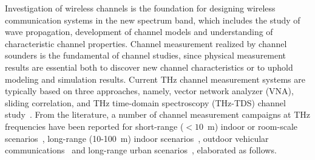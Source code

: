 \documentclass[journal,12pt,draftclsnofoot,onecolumn]{IEEEtran}
\begin{document}
\par Investigation of wireless channels is the foundation for designing wireless communication systems in the new spectrum band, which includes the study of wave propagation, development of channel models and understanding of characteristic channel properties. Channel measurement realized by channel sounders is the fundamental of channel studies, since physical measurement results are essential both to discover new channel characteristics or to uphold modeling and simulation results. Current THz channel measurement systems are typically based on three approaches, namely, vector network analyzer (VNA), sliding correlation, and THz time-domain spectroscopy (THz-TDS) channel study~\cite{wang2022channelsurvey}.
From the literature, a number of channel measurement campaigns at THz frequencies have been reported for short-range ($<10$~m) indoor or room-scale scenarios~\cite{yu2020wideband,yi2021Channel,xing2018propagation,xing2019indoor,kim2016characterization,eckhardt2019measurements,cheng2020thz,fu2020modeling,abbasi2020channel,song2020channel,ju2021millimeter,zantah2019channel}, long-range (10-100~m) indoor scenarios~\cite{Nguyen2018Comparing}, outdoor vehicular communications~\cite{guan2021channel,petrov2020measurements,eckhardt2021channel} and long-range urban scenarios~\cite{abbasi2019double,he2021wireless}, elaborated as follows.
\end{document}
